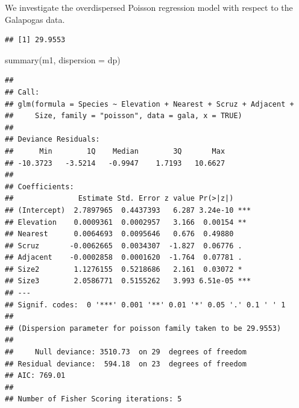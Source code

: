 \documentclass[
  ignorenonframetext,
]{beamer}
\newenvironment{Shaded}{\begin{snugshade}}{\end{snugshade}}
\newcommand{\AttributeTok}[1]{\textcolor[rgb]{0.77,0.63,0.00}{#1}}
\newcommand{\DecValTok}[1]{\textcolor[rgb]{0.00,0.00,0.81}{#1}}
\newcommand{\DocumentationTok}[1]{\textcolor[rgb]{0.56,0.35,0.01}{\textbf{\textit{#1}}}}
\newcommand{\FunctionTok}[1]{\textcolor[rgb]{0.00,0.00,0.00}{#1}}
\newcommand{\NormalTok}[1]{#1}
\newcommand{\OtherTok}[1]{\textcolor[rgb]{0.56,0.35,0.01}{#1}}
\newcommand{\SpecialCharTok}[1]{\textcolor[rgb]{0.00,0.00,0.00}{#1}}
\newcommand{\StringTok}[1]{\textcolor[rgb]{0.31,0.60,0.02}{#1}}
\begin{document}
\begin{frame}[fragile]{}
\protect\hypertarget{section-2}{}
We investigate the overdispersed Poisson regression model with respect
to the Galapogas data.

\vspace{12pt}

\begin{Shaded}
\end{Shaded}

\begin{verbatim}
## [1] 29.9553
\end{verbatim}
\end{frame}

\begin{frame}[fragile]{}
\protect\hypertarget{section-3}{}
\tiny

\begin{Shaded}
\begin{Highlighting}[]
\FunctionTok{summary}\NormalTok{(m1, }\AttributeTok{dispersion =}\NormalTok{ dp)}
\end{Highlighting}
\end{Shaded}

\begin{verbatim}
## 
## Call:
## glm(formula = Species ~ Elevation + Nearest + Scruz + Adjacent + 
##     Size, family = "poisson", data = gala, x = TRUE)
## 
## Deviance Residuals: 
##      Min        1Q    Median        3Q       Max  
## -10.3723   -3.5214   -0.9947    1.7193   10.6627  
## 
## Coefficients:
##               Estimate Std. Error z value Pr(>|z|)    
## (Intercept)  2.7897965  0.4437393   6.287 3.24e-10 ***
## Elevation    0.0009361  0.0002957   3.166  0.00154 ** 
## Nearest      0.0064693  0.0095646   0.676  0.49880    
## Scruz       -0.0062665  0.0034307  -1.827  0.06776 .  
## Adjacent    -0.0002858  0.0001620  -1.764  0.07781 .  
## Size2        1.1276155  0.5218686   2.161  0.03072 *  
## Size3        2.0586771  0.5155262   3.993 6.51e-05 ***
## ---
## Signif. codes:  0 '***' 0.001 '**' 0.01 '*' 0.05 '.' 0.1 ' ' 1
## 
## (Dispersion parameter for poisson family taken to be 29.9553)
## 
##     Null deviance: 3510.73  on 29  degrees of freedom
## Residual deviance:  594.18  on 23  degrees of freedom
## AIC: 769.01
## 
## Number of Fisher Scoring iterations: 5
\end{verbatim}
\end{frame}
\end{document}
